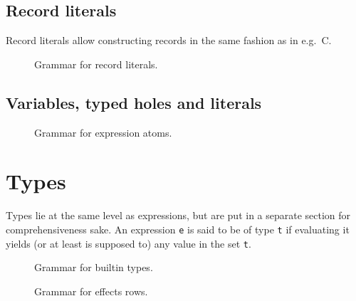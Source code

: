 \subsection{Record literals}\label{subsec:zilch-grammar-expressions-record}

Record literals allow constructing records in the same fashion as in e.g.\ C.

\begin{figure}[H]
	\centering


	\caption{Grammar for record literals.}
	\label{fig:zilch-gramma-expressions-record-grammar}
\end{figure}

\subsection{Variables, typed holes and literals}\label{subsec:zilch-grammar-expressions-basicexpr}

\begin{figure}[H]
	\centering


	\caption{Grammar for expression atoms.}
	\label{fig:zilch-grammar-expressions-atom-grammar}
\end{figure}

\section{Types}\label{sec:zilch-grammar-types}

Types lie at the same level as expressions, but are put in a separate section for comprehensiveness sake.
An expression \verb|e| is said to be of type \verb|t| if evaluating it yields (or at least is supposed to) any value in the set \verb|t|.

\begin{figure}[H]
	\centering


	\caption{Grammar for builtin types.}
	\label{fig:zilch-grammar-types-builtin-grammar}
\end{figure}

\begin{figure}[H]
	\centering


	\caption{Grammar for effects rows.}
	\label{fig:zilch-grammar-types-effectrow-grammar}
\end{figure}

